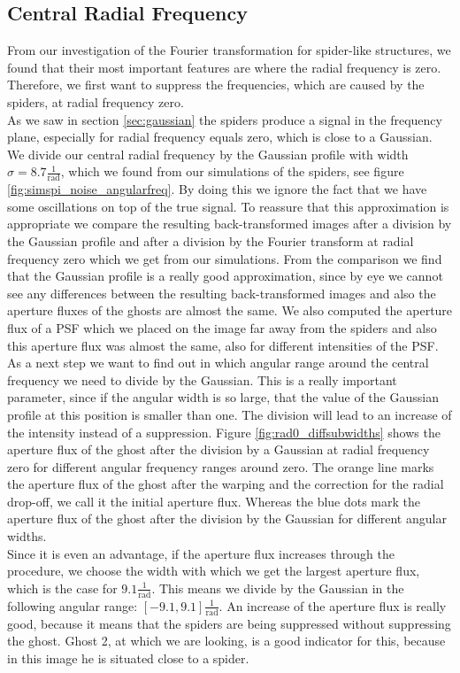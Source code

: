 \subsection{Central Radial Frequency}
\label{sec:central_radial_freq}
From our investigation of the Fourier transformation for spider-like structures, we found that their most important features are where the radial frequency is zero. Therefore, we first want to suppress the frequencies, which are caused by the spiders, at radial frequency zero.\\
As we saw in section \ref{sec:gaussian} the spiders produce a signal in the frequency plane, especially for radial frequency equals zero, which is close to a Gaussian. We divide our central radial frequency by the Gaussian profile with width $\sigma = 8.7 \frac{1}{\mathrm{rad}}$, which we found from our simulations of the spiders, see figure \ref{fig:simspi_noise_angularfreq}. By doing this we ignore the fact that we have some oscillations on top of the true signal. To reassure that this approximation is appropriate we compare the resulting back-transformed images after a division by the Gaussian profile and after a division by the Fourier transform at radial frequency zero which we get from our simulations. From the comparison we find that the Gaussian profile is a really good approximation, since by eye we cannot see any differences between the resulting back-transformed images and also the aperture fluxes of the ghosts are almost the same. We also computed the aperture flux of a PSF which we placed on the image far away from the spiders and also this aperture flux was almost the same, also for different intensities of the PSF.\\
As a next step we want to find out in which angular range around the central frequency we need to divide by the Gaussian. This is a really important parameter, since if the angular width is so large, that the value of the Gaussian profile at this position is smaller than one. The division will lead to an increase of the intensity instead of a suppression. Figure \ref{fig:rad0_diffsubwidths} shows the aperture flux of the ghost after the division by a Gaussian at radial frequency zero for different angular frequency ranges around zero. The orange line marks the aperture flux of the ghost after the warping and the correction for the radial drop-off, we call it the initial aperture flux. Whereas the blue dots mark the aperture flux of the ghost after the division by the Gaussian for different angular widths.\\
Since it is even an advantage, if the aperture flux increases through the procedure, we choose the width with which we get the largest aperture flux, which is the case for $9.1 \frac{1}{\mathrm{rad}}$. This means we divide by the Gaussian in the following angular range: $[-9.1, 9.1] \frac{1}{\mathrm{rad}}$. An increase of the aperture flux is really good, because it means that the spiders are being suppressed without suppressing the ghost. Ghost 2, at which we are looking, is a good indicator for this, because in this image he is situated close to a spider.
